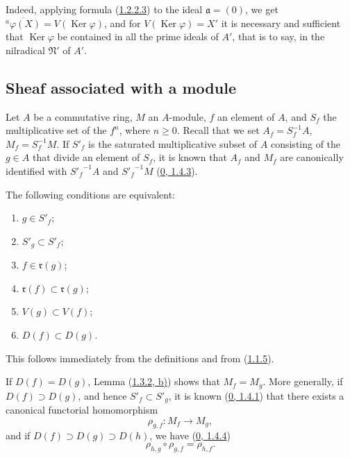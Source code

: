 Indeed, applying formula (\hyperref[I.1.2.2.3]{1.2.2.3}) to the ideal
$\mathfrak{a}=(0)$, we get
$\overline{{}^a\varphi(X)}=V(\operatorname{Ker}\varphi)$, and for
$V(\operatorname{Ker}\varphi)=X'$ it is necessary and sufficient that
$\operatorname{Ker}\varphi$ be contained in all the prime ideals of
$A'$, that is to say, in the nilradical $\mathfrak{N}'$ of $A'$.

\subsection{Sheaf associated with a module}
\label{subsection:I.1.3}
\label{I.1.3}

\begin{env}[1.3.1]
\label{I.1.3.1}
Let $A$ be a commutative ring, $M$ an $A$-module, $f$ an element of $A$, and
$S_f$ the multiplicative set of the $f^n$, where $n\geq0$. Recall that we
set $A_f=S_f^{-1}A$, $M_f=S_f^{-1}M$. If $S'_f$ is the saturated
multiplicative subset of $A$ consisting of the $g\in A$ that divide an
element of $S_f$, it is known that $A_f$ and $M_f$ are canonically identified
with ${S'_f}^{-1}A$ and ${S'_f}^{-1}M$
(\hyperref[0.1.4.3]{0, 1.4.3}).
\end{env}

\begin{lemma}[1.3.2]
\label{I.1.3.2}
The following conditions are equivalent:
\begin{enumerate}
  \item[\rm(a)] $g\in S'_f$;
  \item[\rm(b)] $S'_g\subset S'_f$;
  \item[\rm(c)] $f\in\mathfrak{r}(g)$;
  \item[\rm(d)] $\mathfrak{r}(f)\subset\mathfrak{r}(g)$;
  \item[\rm(e)] $V(g)\subset V(f)$;
  \item[\rm(f)] $D(f)\subset D(g)$.
\end{enumerate}
\end{lemma}

This follows immediately from the definitions and from
(\hyperref[I.1.1.5]{1.1.5}).

\begin{env}[1.3.3]
\label{I.1.3.3}
If $D(f)=D(g)$, Lemma (\hyperref[I.1.3.2]{1.3.2, b)}) shows that
$M_f=M_g$. More generally, if $D(f)\supset D(g)$, and hence
$S'_f\subset S'_g$, it is known (\hyperref[0.1.4.1]{0, 1.4.1}) that there
exists a canonical functorial homomorphism
\[
  \rho_{g,f}:M_f\longrightarrow M_g,
\]
and if $D(f)\supset D(g)\supset D(h)$, we have
(\hyperref[0.1.4.4]{0, 1.4.4})
\begin{equation}
  \rho_{h,g}\circ\rho_{g,f}=\rho_{h,f}.
  \tag{1.3.3.1}\label{I.1.3.3.1}
\end{equation}
\end{env}

